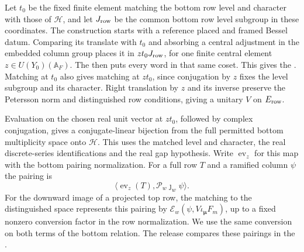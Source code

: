 Let \(t_0\) be the fixed finite element matching the bottom row level
and character with those of \(\mathcal H\), and let \(J_{\rm row}\)
be the common bottom row level subgroup in these coordinates. The
construction starts with a reference placed and framed Bessel datum.
Comparing its translate with \(t_0\) and absorbing a central adjustment
in the embedded column group places it in \(zt_0J_{\rm row}\), for
one finite central element \(z\in U(Y_0)(\mathbb A_F)\).
The
then puts every word in that same coset. This gives the
.
Matching at \(t_0\) also gives matching at \(zt_0\), since
conjugation by \(z\) fixes the level subgroup and its character.
Right translation by \(z\) and its inverse preserve the Petersson norm
and distinguished row conditions, giving a unitary \(V\) on
\(E_{\rm row}\).

Evaluation on the chosen real unit vector at \(zt_0\), followed by
complex conjugation, gives a conjugate-linear bijection from the full
permitted bottom multiplicity space onto \(\mathcal H\). This uses the
matched level and character, the real discrete-series identifications
and the real gap hypothesis. Write \(\operatorname{ev}_z\) for this
map with the bottom pairing normalization. For a full row \(T\)
and a ramified column \(\psi\) the pairing is
\[
 \langle\operatorname{ev}_z(T),\mathcal P_w\jmath_w\psi\rangle .
\]
For the downward image of a projected top row, the matching to the
distinguished space represents this pairing by
\(\mathcal E_w(\psi,V\iota_{\boldsymbol\mu}F_m)\), up to a fixed
nonzero conversion factor in the row normalization. We use the
same conversion on both terms of the bottom relation. The release
compares these pairings in the
.

